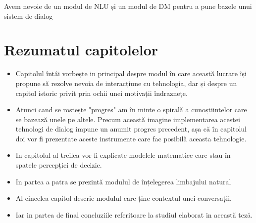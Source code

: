 Avem nevoie de un modul de NLU și un modul de DM pentru a pune bazele unui sistem de dialog

\section{Rezumatul capitolelor}

\begin{itemize}
	\item 
	Capitolul întâi vorbește in principal despre modul în care această lucrare își propune să rezolve nevoia de interacțiune cu tehnologia, dar și despre un capitol istoric privit prin ochii unei motivații îndraznețe.
	\item
	Atunci cand se rostește "progres" am în minte o  spirală a cunoștiintelor care se bazează unele pe altele. Precum această imagine implementarea acestei tehnologi de dialog impune un anumit progres precedent, așa că în capitolul doi vor fi prezentate aceste instrumente care fac posibilă aceasta tehnologie.
	\item
	In capitolul al treilea vor fi explicate modelele matematice care stau în spatele percepției de decizie.
	\item
	In partea a patra se prezintă modulul de înțelegerea limbajului natural
	\item
	Al cincelea capitol descrie modulul care ține contextul unei conversații.
	\item
	Iar in partea de final concluziile referitoare la studiul elaborat in această teză.
\end{itemize}


